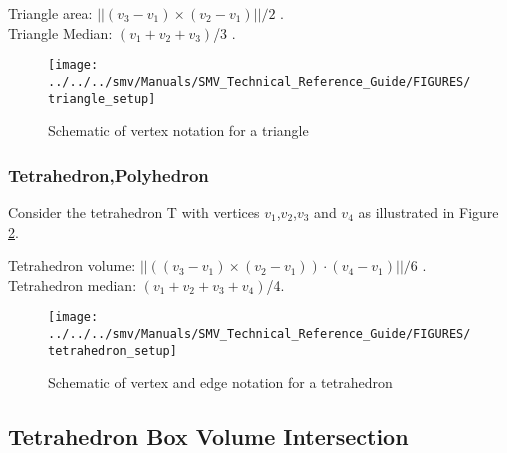 \documentclass[12pt]{article}
\begin{document}
\noindent Triangle area: $||(v_3-v_1)\times (v_2-v_1)||/2$ . \\
Triangle Median: $(v_1+v_2+v_3)$/3 .

\begin{figure}
\begin{center}
\texttt{[image: ../../../smv/Manuals/SMV\_Technical\_Reference\_Guide/FIGURES/triangle\_setup]}
\end{center}
\caption{Schematic of vertex notation for a triangle}
\label{figure:triangle_setup}
\end{figure}

\subsubsection{Tetrahedron,Polyhedron}
Consider the tetrahedron T with vertices $v_1$,$v_2$,$v_3$ and $v_4$ as illustrated in Figure \ref{figure:tetrahedron_setup}.

\noindent Tetrahedron volume: $||((v_3-v_1)\times (v_2-v_1))\cdot (v_4-v_1)||/6$ .\\
Tetrahedron median: $(v_1+v_2+v_3+v_4)$/4.

\begin{figure}
\begin{center}
\texttt{[image: ../../../smv/Manuals/SMV\_Technical\_Reference\_Guide/FIGURES/tetrahedron\_setup]}
\end{center}
\caption{Schematic of vertex and edge notation for a tetrahedron}
\label{figure:tetrahedron_setup}
\end{figure}


\newcommand{\tetra}{\mbox{tetra\_bounds}}
\newcommand{\bbox}{\mbox{box\_bounds}}
\newcommand{\txtmin}{\mbox{min}}
\newcommand{\txtmax}{\mbox{max}}
\subsection{Tetrahedron Box Volume Intersection}
\end{document}
